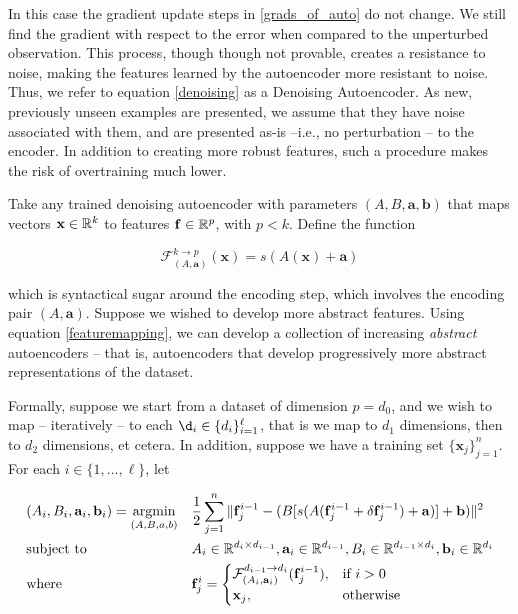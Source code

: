 In this case the gradient update steps in \ref{grads_of_auto} do not change. We still find the gradient with respect to the error when compared to the unperturbed observation. This process, though though not provable, creates a resistance to noise, making the features learned by the autoencoder more resistant to noise. Thus, we refer to equation \eqref{denoising} as a Denoising Autoencoder. As new, previously unseen examples are presented, we assume that they have noise associated with them, and are presented as-is --i.e., no perturbation -- to the encoder. In addition to creating more robust features, such a procedure makes the risk of overtraining much lower.

Take any trained denoising autoencoder with parameters $(A,B,\mathbf{a},\mathbf{b})$ that maps vectors $\mathbf{x}\in\mathbb{R}^k$ to features $\mathbf{f}\in\mathbb{R}^{p}$, with $p<k$. Define the function

\begin{equation}
\label{featuremapping}
\mathcal{F}_{(A,\mathbf{a})}^{k\rightarrow p}(\mathbf{x}) = s(A(\mathbf{x}) + \mathbf{a})
\end{equation}

which is syntactical sugar around the encoding step, which involves the encoding pair $(A,\mathbf{a})$. Suppose we wished to develop more abstract features. Using equation \eqref{featuremapping}, we can develop a collection of increasing \emph{abstract} autoencoders -- that is, autoencoders that develop progressively more abstract representations of the dataset. 

Formally, suppose we start from a dataset of dimension $p = d_0$, and we wish to map -- iteratively --  to each $\d_i\in\{d_i\}_{i=1}^{\ell}$, that is we map to $d_1$ dimensions, then to $d_2$ dimensions, et cetera. In addition, suppose we have a training set $\{\mathbf{x}_j\}_{j=1}^n$. For each $i\in\{1,\ldots,\ell\}$, let


\begin{equation}
\begin{aligned}
\label{auto_soln}
& (A_i,B_i,\mathbf{a}_i,\mathbf{b}_i) = \underset{(A,B,a,b)}{\text{argmin}}
& & \frac{1}{2}\sum_{j = 1}^{n} \Vert \mathbf{f}_j^{i-1} -  (B[s(A(\mathbf{f}_j^{i-1}+\delta\mathbf{f}_j^{i-1}) + \mathbf{a})]+\mathbf{b}) \Vert ^ 2 \\
& \text{subject to}
& & A_i\in\mathbb{R}^{d_i\times d_{i-1}}, \mathbf{a}_i\in\mathbb{R}^{d_{i-1}}, B_i\in\mathbb{R}^{d_{i-1}\times d_{i}}, \mathbf{b}_i\in\mathbb{R}^{d_{i}} \\
& \text{where}
& & \mathbf{f}^{i}_j = 
	\begin{cases} 
		\mathcal{F}_{(A_{i},\mathbf{a}_{i})}^{d_{i-1}\rightarrow d_i}(\mathbf{f}_j^{i-1}), & \mbox{if } i>0\\ 
		\mathbf{x}_j, & \mbox{otherwise}
	\end{cases}
\end{aligned}
\end{equation}


